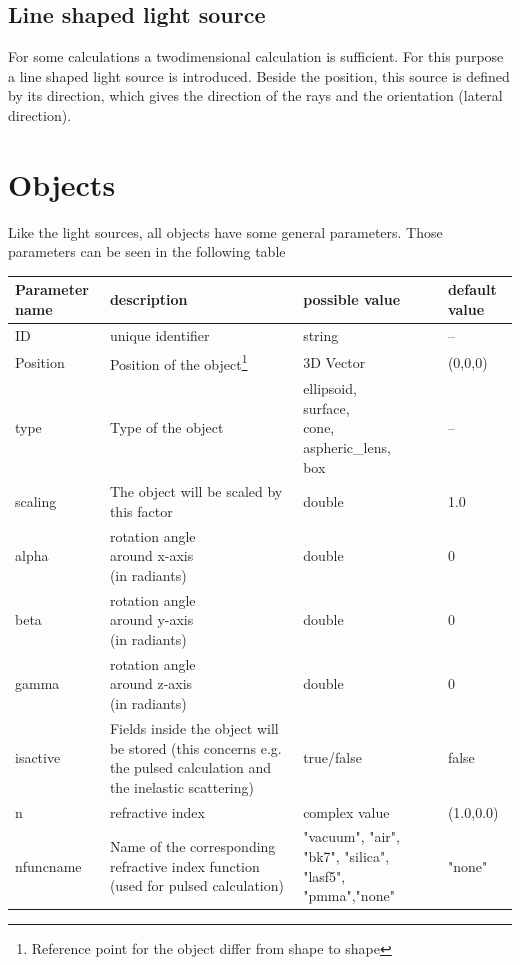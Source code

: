 \documentclass[a4paper,html,11pt,openany]{book}
\begin{document}
\subsection{Line shaped light source}
For some calculations a twodimensional calculation is sufficient. For this purpose a line shaped light source is introduced. Beside the position, this source is defined by its direction, which gives the direction of the rays and the orientation (lateral direction). 

 \section{Objects}
 Like the light sources, all objects have some general parameters. Those parameters can be seen in the following table
 
 \vspace{1em}
 \begin{longtable}{p{2cm}|m{3.5cm}|m{3.0cm}|p{1.7cm}}
 Parameter name & description  & possible value & default value\\
 \hline
 ID & unique identifier & string & -- \\
 \hline
  Position & Position of the object\footnote{Reference point for the object differ from shape to shape} & 3D Vector & (0,0,0) \\
  \hline
  type & Type of the object  & \parbox{3cm}{ellipsoid,\\surface,\\cone,\\aspheric\_lens,\\box} & --  \\
  \hline   
  scaling & The object will be scaled by this factor & double & 1.0 \\
  \hline
  alpha & \parbox{3.5cm}{rotation angle\\around x-axis\\(in radiants)} & double & 0 \\ 
    \hline
  beta & \parbox{3.5cm}{rotation angle\\around y-axis\\(in radiants)} & double & 0 \\ 
      \hline
  gamma & \parbox{3.5cm}{rotation angle\\around z-axis\\(in radiants)} & double & 0 \\ 
  \hline
  isactive & \parbox{3.5cm}{Fields inside the object will be stored (this concerns e.g. the pulsed calculation and the inelastic scattering)} & true/false & false \\
  \hline
  n & refractive index & complex value & (1.0,0.0) \\
  \hline
  nfuncname & Name of the corresponding refractive index function (used for pulsed calculation) & "vacuum", "air", "bk7", "silica", "lasf5", "pmma","none" & "none"
\end{longtable} 
  
\end{document}
